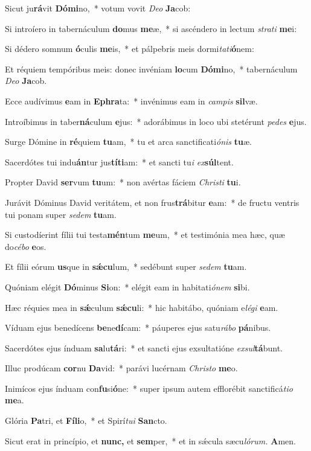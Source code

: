 \item Sicut ju\textbf{rá}vit \textbf{Dó}\textbf{mi}no,~* votum vovit \textit{Deo} \textbf{Ja}cob:
\item Si introíero in tabernáculum \textbf{do}mus \textbf{me}æ,~* si ascéndero in lectum \textit{strati} \textbf{me}i:
\item Si dédero somnum \textbf{ó}culis \textbf{me}is,~* et pálpebris meis dormi\textit{tati}\textbf{ó}nem:
\item Et réquiem tempóribus meis: donec invéniam \textbf{lo}cum \textbf{Dó}\textbf{mi}no,~* tabernáculum \textit{Deo} \textbf{Ja}cob.
\item Ecce audívimus \textbf{e}am in \textbf{E}\textbf{phra}ta:~* invénimus eam in \textit{campis} \textbf{sil}væ.
\item Introíbimus in taber\textbf{ná}culum \textbf{e}jus:~* adorábimus in loco ubi stetérunt \textit{pedes} \textbf{e}jus.
\item Surge Dómine in \textbf{ré}quiem \textbf{tu}am,~* tu et arca sanctificati\textit{ónis} \textbf{tu}æ.
\item Sacerdótes tui indu\textbf{án}tur jus\textbf{tí}\textbf{ti}am:~* et sancti tu\hspace{0.01em}\textit{i} \textit{ex}\textbf{súl}tent.
\item Propter David \textbf{ser}vum \textbf{tu}um:~* non avértas fáciem \textit{Christi} \textbf{tu}i.
\item Jurávit Dóminus David veritátem, et non frus\textbf{trá}bitur \textbf{e}am:~* de fru\-ctu ventris tui ponam super \textit{sedem} \textbf{tu}am.
\item Si custodíerint fílii tui testa\textbf{mén}tum \textbf{me}um,~* et testimónia mea hæc, quæ do\hspace{0.02em}\textit{cébo} \textbf{e}os.
\item Et fílii eórum \textbf{us}que in \textbf{sǽ}\textbf{cu}lum,~* sedébunt super \textit{sedem} \textbf{tu}am.
\item Quóniam elégit \textbf{Dó}minus \textbf{Si}on:~* elégit eam in habitati\hspace{0.01em}\textit{ónem} \textbf{si}bi.
\item Hæc réquies mea in \textbf{sǽ}culum \textbf{sǽ}\textbf{cu}li:~* hic habitábo, quóniam e\tinyhspace\textit{légi} \textbf{e}am.
\item Víduam ejus benedícens \textbf{be}ne\textbf{dí}cam:~* páuperes ejus satu\textit{rábo} \textbf{pá}nibus.
\item Sacerdótes ejus índuam \textbf{sa}lu\textbf{tá}ri:~* et sancti ejus exsultatióne \textit{exsul}\textbf{tá}bunt.
\item Illuc prodúcam \textbf{cor}nu \textbf{Da}vid:~* parávi lucérnam \textit{Christo} \textbf{me}o.
\item Inimícos ejus índuam con\textbf{fu}si\textbf{ó}ne:~* super ipsum autem efflorébit san\-ctificá\tinyhspace\textit{tio} \textbf{me}a.
\item Glória \textbf{Pa}tri, et \textbf{Fí}\textbf{li}o,~* et Spirí\tinyhspace\textit{tui} \textbf{San}cto.
\item Sicut erat in princípio, et \textbf{nunc,} et \textbf{sem}per,~* et in sǽcula sæcu\tinyhspace\textit{lórum.} \textbf{A}men.
